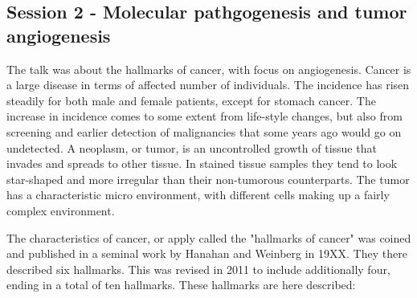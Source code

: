 \documentclass[12p]{article}
\begin{document}
\subsection*{Session 2 - Molecular pathgogenesis and tumor angiogenesis}

The talk was about the hallmarks of cancer, with focus on angiogenesis.
Cancer is a large disease in terms of affected number of individuals.
The incidence has risen steadily for both male and female patients, except for stomach cancer.
The increase in incidence comes to some extent from life-style changes, but also from screening and earlier detection of malignancies that some years ago would go on undetected.
A neoplasm, or tumor, is an uncontrolled growth of tissue that invades and spreads to other tissue.
In stained tissue samples they tend to look star-shaped and more irregular than their non-tumorous counterparts.
The tumor has a characteristic micro environment, with different cells making up a fairly complex environment.

The characteristics of cancer, or apply called the "hallmarks of cancer" was coined and published in a seminal work by Hanahan and Weinberg in 19XX.
They there described six hallmarks.
This was revised in 2011 to include additionally four, ending in a total of ten hallmarks.
These hallmarks are here described:
\end{document}
